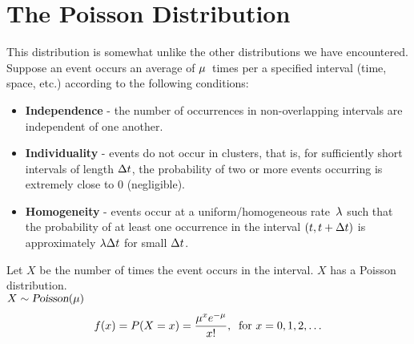 \section{The Poisson Distribution}
This distribution is somewhat unlike the other distributions we have encountered. Suppose an event occurs an average of $\mu$~times per a specified interval (time, space, etc.) according to the following conditions:
\begin{itemize}
    \item \textbf{Independence} - the number of occurrences in non-overlapping intervals are independent of one another.
    \item \textbf{Individuality} - events do not occur in clusters, that is, for sufficiently short intervals of length $\Delta t$, the probability of two or more events occurring is extremely close to 0 (negligible).
    \item \textbf{Homogeneity} - events occur at a uniform/homogeneous rate~$\lambda$ such that the probability of at least one occurrence in the interval $(t, t+\Delta t)$ is approximately $\lambda \Delta t$ for small $\Delta t$.
\end{itemize}
Let $X$ be the number of times the event occurs in the interval. $X$ has a Poisson distribution. \\
$X \sim \operatorname{\textsl{Poisson}}(\mu)$
\[
    f(x) = P(X = x) = \frac{\mu^x e^{-\mu}}{x!},\:\text{ for } x = 0,1,2,\ldots
\]
\pagebreak[3]
